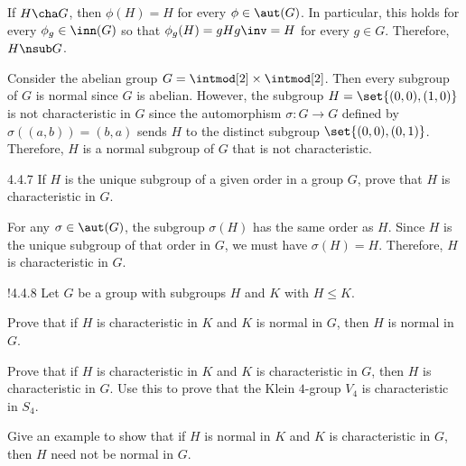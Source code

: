 \begin{sol}
	If $H \cha G$, then $\phi(H) = H$ for every $\phi \in \aut(G)$.
	In particular, this holds for every $\phi_g \in \inn(G)$ so that $\phi_g(H) = gHg\inv = H$ for every $g \in G$.
	Therefore, $H \nsub G$.

	Consider the abelian group $G = \intmod[2] \times \intmod[2]$.
	Then every subgroup of $G$ is normal since $G$ is abelian.
	However, the subgroup $H = \set{(0,0), (1,0)}$ is not characteristic in $G$ since the automorphism $\sigma \colon G \to G$ defined by $\sigma((a,b)) = (b,a)$ sends $H$ to the distinct subgroup $\set{(0,0), (0,1)}$.
	Therefore, $H$ is a normal subgroup of $G$ that is not characteristic.
\end{sol}

\begin{exercise}{4.4.7} 
	If $H$ is the unique subgroup of a given order in a group $G$, prove that $H$ is characteristic in $G$.
\end{exercise}

\begin{sol}
	For any $\sigma \in \aut(G)$, the subgroup $\sigma(H)$ has the same order as $H$.
	Since $H$ is the unique subgroup of that order in $G$, we must have $\sigma(H) = H$.
	Therefore, $H$ is characteristic in $G$.
\end{sol}

\begin{exercise}!{4.4.8}
	Let $G$ be a group with subgroups $H$ and $K$ with $H \leq K$.
	\begin{subexercises}
		\item Prove that if $H$ is characteristic in $K$ and $K$ is normal in $G$, then $H$ is normal in $G$.
		\item Prove that if $H$ is characteristic in $K$ and $K$ is characteristic in $G$, then $H$ is characteristic in $G$.
		Use this to prove that the Klein $4$-group $V_4$ is characteristic in $S_4$.
		\item Give an example to show that if $H$ is normal in $K$ and $K$ is characteristic in $G$, then $H$ need not be normal in $G$.
	\end{subexercises}
\end{exercise}


